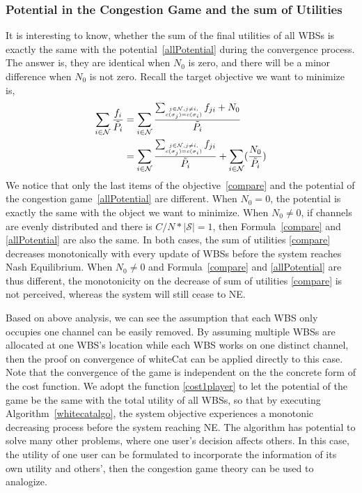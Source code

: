 \documentclass[times]{ettauth}
\theoremstyle{mytheoremstyle}
\theoremstyle{mytheoremstyle}
\theoremstyle{mytheoremstyle}
\begin{document}
\subsubsection{Potential in the Congestion Game and the sum of Utilities}
It is interesting to know, whether the sum of the final utilities of all WBSs is exactly the same with the potential~\ref{allPotential} during the convergence process.
The answer is, they are identical when $N_0$ is zero, and there will be a minor difference when $N_0$ is not zero.
Recall the target objective we want to minimize is,
\begin{equation}
\label{compare}
\begin{split}	
\sum_{i\in \mathcal{N}}\dfrac{f_i}{\tilde{P_i}}
& = \sum\limits_{i\in \mathcal{N}}\dfrac{\sum_{\tiny\substack{j\in \mathcal{N}, j\ne i,\\ c(\sigma_j)=c(\sigma_i)}}f_{ji}+N_0}{\tilde{P_i}}\\
& = \sum\limits_{i\in \mathcal{N}}\dfrac{\sum_{\tiny\substack{j\in \mathcal{N}, j\ne i,\\ c(\sigma_j)=c(\sigma_i)}}f_{ji}}{\tilde{P_i}} + \sum\limits_{i\in \mathcal{N}}  (\dfrac{N_0}{\tilde{P_i}})\\
\end{split}
\end{equation}
We notice that only the last items of the objective~\ref{compare} and the potential of the congestion game~\ref{allPotential} are different.
When $N_0=0$, the potential is exactly the same with the object we want to minimize.
When $N_0\neq 0$, if channels are evenly distributed and there is $C/N*\mid \mathcal{S}\mid = 1$, then Formula~\ref{compare} and \ref{allPotential} are also the same.
In both cases, the sum of utilities \ref{compare} decreases monotonically with every update of WBSs before the system reaches Nash Equilibrium.
%
When $N_0\neq 0$ and Formula~\ref{compare} and \ref{allPotential} are thus different, the monotonicity on the decrease of sum of utilities \ref{compare} is not perceived, whereas the system will still cease to NE.

Based on above analysis, we can see the assumption that each WBS only occupies one channel can be easily removed.
By assuming multiple WBSs are allocated at one WBS's location while each WBS works on one distinct channel, then the proof on convergence of whiteCat can be applied directly to this case.
Note that the convergence of the game is independent on the the concrete form of the cost function. 
We adopt the function \ref{cost1player} to let the potential of the game be the same with the total utility of all WBSs, so that by executing Algorithm~\ref{whitecatalgo}, the system objective experiences a monotonic decreasing process before the system reaching NE.
The algorithm has potential to solve many other problems, where one user's decision affects others.
In this case, the utility of one user can be formulated to incorporate the information of its own utility and others', then the congestion game theory can be used to analogize.
\end{document}
